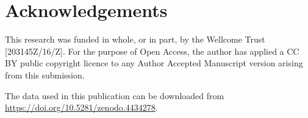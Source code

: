 \section{Acknowledgements}
This research was funded in whole, or in part, by the Wellcome Trust [203145Z/16/Z]. For the purpose of Open Access, the author has applied a CC BY public copyright licence to any Author Accepted Manuscript version arising from this submission.

The data used in this publication can be downloaded from \href{https://doi.org/10.5281/zenodo.4434278}{https://doi.org/10.5281/zenodo.4434278}.
